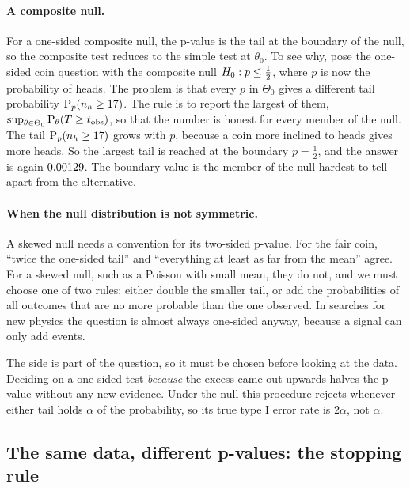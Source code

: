 \paragraph{A composite null.}
For a one-sided composite null, the p-value is the tail at the boundary of the
null, so the composite test reduces to the simple test at $\theta_0$. To see
why, pose the one-sided coin question with the composite null
$H_0:p\le\frac12$, where $p$ is now the probability of heads. The problem is
that every $p$ in $\Theta_0$ gives a different tail probability
$\operatorname{P}_p(n_h\ge17)$. The rule  is to report the largest of
them, $\sup_{\theta\in\Theta_0}\operatorname{P}_\theta(T\ge t_{\rm obs})$, so that the
number is honest for every member of the null. The tail $\operatorname{P}_p(n_h\ge17)$
grows with $p$, because a coin more inclined to heads gives more heads. So the
largest tail is reached at the boundary $p=\frac12$, and the answer is again
$0.00129$. The boundary value is the member of the null hardest to tell
apart from the alternative.

\paragraph{When the null distribution is not symmetric.}
A skewed null needs a convention for its two-sided p-value. For the fair coin,
``twice the one-sided tail'' and ``everything at least as far from the mean''
agree. For a skewed null, such as a Poisson with small mean, they do not, and
we must choose one of two rules: either double the
smaller tail, or add the probabilities of all outcomes that are no more
probable than the one observed. In searches for new physics the question is
almost always one-sided anyway, because a signal can only add events.

\begin{pitfall}
The side is part of the question, so it must be chosen before looking at the
data. Deciding on a one-sided test \emph{because} the excess came out
upwards halves the p-value without any new evidence. Under the null this
procedure rejects whenever either tail holds $\alpha$ of the probability, so
its true type I error rate is $2\alpha$, not $\alpha$.
\end{pitfall}

\subsection{The same data, different p-values: the stopping rule}
\label{4a:sec:stopping}

